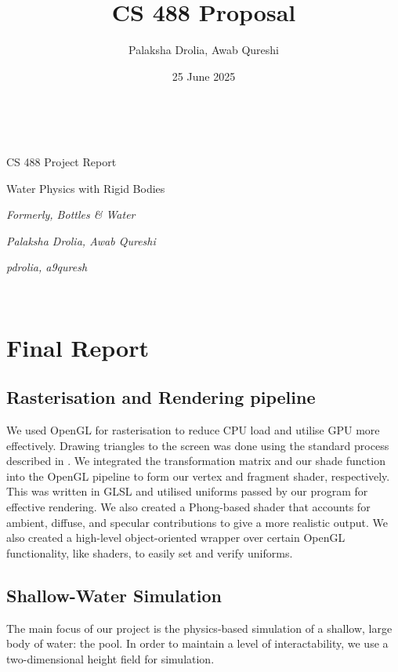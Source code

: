 

\usepackage[
    backend=biber,
    style=ieee,
]{biblatex}



\title{CS 488 Proposal}
\author{Palaksha Drolia, Awab Qureshi}
\date{25 June 2025}



~\vfill
\begin{center}
\Large

CS 488 Project Report

\Huge 
Water Physics with Rigid Bodies
\vspace{0.5em}

\large
\textit{Formerly, Bottles \& Water}
\vspace{1em}

\textit{Palaksha Drolia, Awab Qureshi}

\textit{pdrolia, a9quresh}

\end{center}
\vfill ~\vfill~
\newpage

\section{Final Report}
\subsection{Rasterisation and Rendering pipeline}
We used OpenGL for rasterisation to reduce CPU load and utilise GPU more effectively. 
Drawing triangles to the screen was done using the standard process described in \cite{LearnOpenGL:Ch5}.
We integrated the transformation matrix and our shade function into the OpenGL pipeline to form our vertex and fragment shader, respectively. This was written in GLSL and utilised uniforms passed by our program for effective rendering. We also created a Phong-based shader that accounts for ambient, diffuse, and specular contributions to give a more realistic output.
We also created a high-level object-oriented wrapper over certain OpenGL functionality, like shaders, to easily set and verify uniforms.
\subsection{Shallow-Water Simulation}
The main focus of our project is the physics-based simulation of a shallow, large body of water: the pool.
In order to maintain a level of interactability, we use a two-dimensional height field for simulation.

